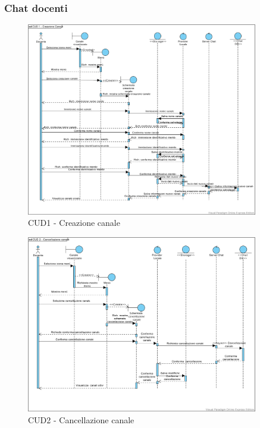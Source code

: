 \pagebreak
\subsubsection{Chat docenti}
\begin{figure}[!h]
	\centering
	\includegraphics[width=0.9\textwidth]{imgs/gruppo6/sequence/CUD1_creazione_canale.pdf}
	\caption{CUD1 - Creazione canale}
	\label{fig:seq-cud1}
\end{figure}

\begin{figure}
	\centering
	\includegraphics[width=0.9\textwidth]{imgs/gruppo6/sequence/CUD2_cancellazione_canale.pdf}
	\caption{CUD2 - Cancellazione canale}
	\label{fig:seq-cud2}
\end{figure}


